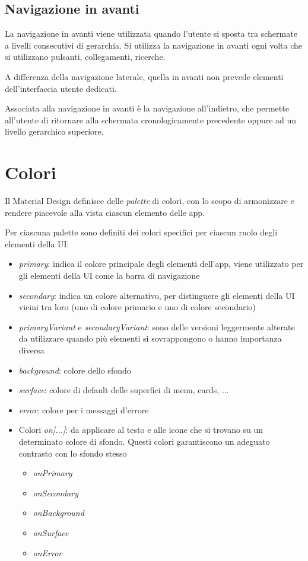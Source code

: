 \documentclass[12pt, a4paper]{report}
\begin{document}
    		\subsection{Navigazione in avanti}
    		La navigazione in avanti viene utilizzata quando l'utente si sposta tra schermate a livelli consecutivi di gerarchia. Si utilizza la navigazione in avanti ogni volta che si utilizzano pulsanti, collegamenti, ricerche.

    		A differenza della navigazione laterale, quella in avanti non prevede elementi dell'interfaccia utente dedicati.

    		Associata alla navigazione in avanti è la navigazione all'indietro, che permette all'utente di ritornare alla schermata cronologicamente precedente oppure ad un livello gerarchico superiore.	
	
	\section{Colori}
	Il Material Design definisce delle \textit{palette} di colori, con lo scopo di armonizzare e rendere piacevole alla vista ciascun elemento delle app.
	
	Per ciascuna palette sono definiti dei colori specifici per ciascun ruolo degli elementi della UI:
	\begin{itemize}
		\item \textit{primary}: indica il colore principale degli elementi dell'app, viene utilizzato per gli elementi della UI come la barra di navigazione
		\item \textit{secondary}: indica un colore alternativo, per distinguere gli elementi della UI vicini tra loro (uno di colore primario e uno di colore secondario)
		\item \textit{primaryVariant} e \textit{secondaryVariant}: sono delle versioni leggermente alterate da utilizzare quando più elementi si sovrappongono o hanno importanza diversa
		\item \textit{background}: colore dello sfondo
		\item \textit{surface}: colore di default delle superfici di menu, cards, ...
		\item \textit{error}: colore per i messaggi d'errore
		\item Colori \textit{on[...]}: da applicare al testo e alle icone che si trovano su un determinato colore di sfondo. Questi colori garantiscono un adeguato contrasto con lo sfondo stesso
		\begin{itemize}
			\item \textit{onPrimary}
			\item \textit{onSecondary}
			\item \textit{onBackground}
			\item \textit{onSurface}
			\item \textit{onError}
		\end{itemize}
	\end{itemize}
	
\end{document}
